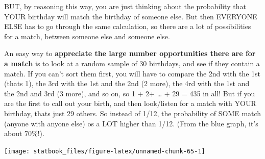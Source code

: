 \documentclass[]{book}
\newenvironment{Shaded}{\begin{snugshade}}{\end{snugshade}}
\newcommand{\CommentTok}[1]{\textcolor[rgb]{0.56,0.35,0.01}{\textit{#1}}}
\newcommand{\DataTypeTok}[1]{\textcolor[rgb]{0.13,0.29,0.53}{#1}}
\newcommand{\DecValTok}[1]{\textcolor[rgb]{0.00,0.00,0.81}{#1}}
\newcommand{\FloatTok}[1]{\textcolor[rgb]{0.00,0.00,0.81}{#1}}
\newcommand{\KeywordTok}[1]{\textcolor[rgb]{0.13,0.29,0.53}{\textbf{#1}}}
\newcommand{\NormalTok}[1]{#1}
\newcommand{\OperatorTok}[1]{\textcolor[rgb]{0.81,0.36,0.00}{\textbf{#1}}}
\newcommand{\OtherTok}[1]{\textcolor[rgb]{0.56,0.35,0.01}{#1}}
\newcommand{\StringTok}[1]{\textcolor[rgb]{0.31,0.60,0.02}{#1}}
\begin{document}
BUT, by reasoning this way, you are just thinking about the probability that YOUR birthday will match the birthday of someone else. But then EVERYONE ELSE has to go through the same calculation, so there are a lot of possibilities for a match, between someone else and someone else.

An easy way to \textbf{appreciate the large number opportunities there are for a match} is to look at a random sample of 30 birthdays, and see if they contain a match. If you can't sort them first, you will have to compare the 2nd with the 1st (thats 1), the 3rd with the 1st and the 2nd (2 more), the 4rd with the 1st and the 2nd and 3rd (3 more), and so on, so 1 + 2+ \ldots{} + 29 = 435 in all! But if you are the first to call out your birth, and then look/listen for a match with YOUR birthday, thats just 29 others. So instead of 1/12, the probability of SOME match (anyone with anyone else) os a LOT higher than 1/12. (From the blue graph, it's about 70\%!).

\begin{Shaded}
\end{Shaded}

\begin{center}\texttt{[image: statbook\_files/figure-latex/unnamed-chunk-65-1]} \end{center}
\end{document}
